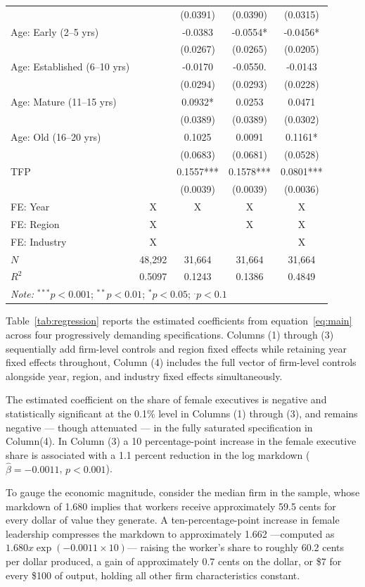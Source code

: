 \documentclass[12pt]{article}
\begin{document}
\begin{table}[H]
\begin{tabular}{lcccc}
 &  & (0.0391) & (0.0390) & (0.0315) \\
Age: Early (2--5 yrs) &  & -0.0383 & -0.0554* & -0.0456* \\
 &  & (0.0267) & (0.0265) & (0.0205) \\
Age: Established (6--10 yrs) &  & -0.0170 & -0.0550. & -0.0143 \\
 &  & (0.0294) & (0.0293) & (0.0228) \\
Age: Mature (11--15 yrs) &  & 0.0932* & 0.0253 & 0.0471 \\
 &  & (0.0389) & (0.0389) & (0.0302) \\
Age: Old (16--20 yrs) &  & 0.1025 & 0.0091 & 0.1161* \\
 &  & (0.0683) & (0.0681) & (0.0528) \\
TFP &  & 0.1557*** & 0.1578*** & 0.0801*** \\
 &  & (0.0039) & (0.0039) & (0.0036) \\
\hline
FE: Year & X & X & X & X \\
FE: Region & X &  & X & X \\
FE: Industry & X &  &  & X \\
 \hline
$N$ & 48,292 & 31,664 & 31,664 & 31,664 \\
$R^{2}$ & 0.5097 & 0.1243 & 0.1386 & 0.4849 \\
\hline\hline
\multicolumn{5}{l}{\textit{Note:} $^{***}p<0.001$; $^{**}p<0.01$; $^{*}p<0.05$; $^{.}p<0.1$} \\
\end{tabular}
\end{table}

Table~\ref{tab:regression} reports the estimated coefficients from equation~\eqref{eq:main} across four progressively demanding specifications. Columns (1) through (3) sequentially add firm-level controls and region fixed effects while retaining year fixed effects throughout, Column (4) includes the full vector of firm-level controls alongside year, region, and industry fixed effects simultaneously.

The estimated coefficient on the share of female executives is negative and statistically significant at the 0.1\% level in Columns (1) through (3), and remains negative — though attenuated — in the fully saturated specification in Column(4). In Column (3) a 10 percentage-point increase in the female executive share is associated with a 1.1 percent reduction in the log markdown ($\hat{\beta} = -0.0011$, $p < 0.001$). 

To gauge the economic magnitude, consider the median firm in the sample, whose markdown of 1.680 implies that workers receive approximately 59.5 cents for every dollar of value they generate. A ten-percentage-point increase in female leadership compresses the markdown to approximately 1.662 ---computed as $1.680 x \exp(-0.0011 \times 10)$--- raising the worker's share to roughly 60.2 cents per dollar produced, a gain of approximately 0.7 cents on the dollar, or \$7 for every \$100 of output, holding all other firm characteristics constant.
\end{document}
